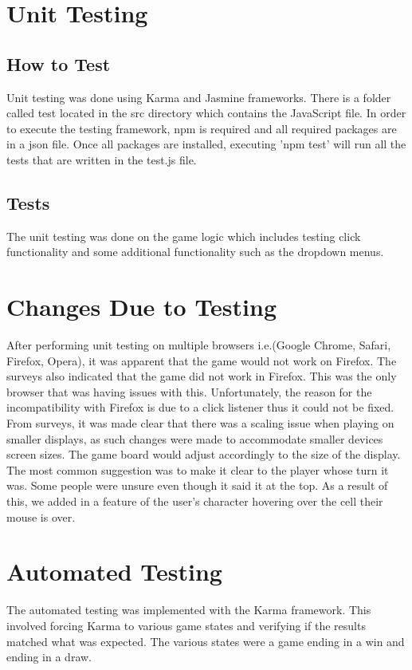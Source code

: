 \documentclass[12pt, titlepage]{article}
\begin{document}
\section{Unit Testing}
\subsection{How to Test}
Unit testing was done using Karma and Jasmine frameworks. There is a folder called test
located in the src directory which contains the JavaScript file. In order to execute the testing framework, 
npm is required and all required packages are in a json file. Once all packages are installed, 
executing 'npm test' will run all the tests that are written in the test.js file.
\subsection{Tests}
The unit testing was done on the game logic which includes testing click functionality and some additional functionality such as the dropdown menus.
\section{Changes Due to Testing} \label{ChangesAfterTesting}
After performing unit testing on multiple browsers i.e.(Google Chrome, Safari, Firefox, Opera),
it was apparent that the game would not work on Firefox. The surveys also indicated that the game did
not work in Firefox. This was the only browser that was having issues with this. Unfortunately,
the reason for the incompatibility with Firefox is due to a click listener thus it could not be fixed. From
surveys, it was made clear that there was a scaling issue when playing on smaller displays, as such
changes were made to accommodate smaller devices screen sizes. The game board would adjust 
accordingly to the size of the display. The most common suggestion was to make it clear to the player whose turn it was. Some people were unsure even though it said it at the top. As a result of this, we added in a feature of the user's character hovering over the cell their mouse is over.
\section{Automated Testing}
The automated testing was implemented with the Karma framework. This involved forcing Karma
to various game states and verifying if the results matched what was expected. The various 
states were a game ending in a win and ending in a draw.
\end{document}
